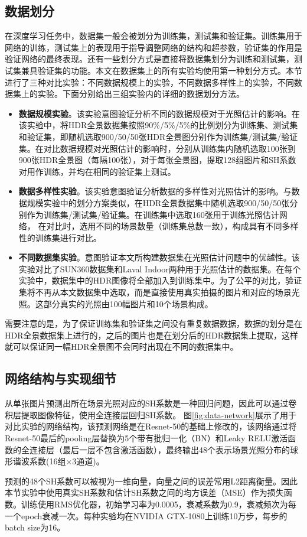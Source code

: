 \subsection{数据划分}
在深度学习任务中，数据集一般会被划分为训练集，测试集和验证集。训练集用于网络的训练，测试集上的表现用于指导调整网络的结构和超参数，验证集的作用是验证网络的最终表现。还有一些划分方式是直接将数据集划分为训练和测试集，测试集兼具验证集的功能。本文在数据集上的所有实验均使用第一种划分方式。本节进行了三种对比实验：不同数据规模上的实验，不同数据多样性上的实验，不同数据集上的实验。下面分别给出三组实验内的详细的数据划分方法。
\begin{itemize}
    \item \textbf{数据规模实验}。该实验意图验证分析不同的数据规模对于光照估计的影响。在该实验中，将HDR全景数据集按照90\%/5\%/5\%的比例划分为训练集、测试集和验证集，即随机选取900/50/50张HDR全景图分别作为训练集/测试集/验证集。在对比数据规模对光照估计的影响时，分别从训练集内随机选取100张到900张HDR全景图（每隔100张），对于每张全景图，提取128组图片和SH系数对用作训练，并均在相同的验证集上测试。
    \item \textbf{数据多样性实验}。该实验意图验证分析数据的多样性对光照估计的影响。与数据规模实验中的划分方案类似，在HDR全景数据集中随机选取900/50/50张分别作为训练集/测试集/验证集。在训练集中选取160张用于训练光照估计网络， 在对比时，选用不同的场景数量（训练集总数一致），构成具有不同多样性的训练集进行对比。
    \item \textbf{不同数据集实验}。意图验证本文所构建数据集在光照估计问题中的优越性。该实验对比了SUN360\cite{xiao2012recognizing}数据集和Laval Indoor\cite{gardner2017learning}两种用于光照估计的数据集。在每个实验中，数据集中的HDR图像将全部加入到训练集中。为了公平的对比，验证集将不再从本文数据集中选取，而是直接使用真实拍摄的图片和对应的场景光照。这部分真实的光照由100幅图片和10个场景构成。
\end{itemize}

需要注意的是，为了保证训练集和验证集之间没有重复数据数据，数据的划分是在HDR全景数据集上进行的，之后的图片也是在划分后的HDR数据集上提取，这样就可以保证同一幅HDR全景图不会同时出现在不同的数据集中。
\subsection{网络结构与实现细节}
从单张图片预测出所在场景光照对应的SH系数是一种回归问题，因此可以通过卷积层提取图像特征，使用全连接层回归SH系数。
图\ref{fig:data-network}展示了用于对比实验的网络结构，该预测网络是在Resnet-50\cite{he2016deep}的基础上修改的，该网络通过将Resnet-50最后的pooling层替换为5个带有批归一化（BN）\cite{ioffe2015batch}和Leaky RELU激活函数\cite{maas2013rectifier}的全连接层（最后一层不包含激活函数），最终输出48个表示场景光照分布的球形谐波系数(16组$\times$3通道)。

预测的48个SH系数可以被视为一维向量，向量之间的误差常用L2距离衡量。因此本节实验中使用真实SH系数和估计SH系数之间的均方误差（MSE）作为损失函数。训练使用RMS优化器\cite{tieleman2012lecture}，初始学习率为0.0005，衰减系数为0.9，衰减频次为每一个epoch衰减一次。每种实验均在NVIDIA GTX-1080上训练10万步，每步的batch size为16。
